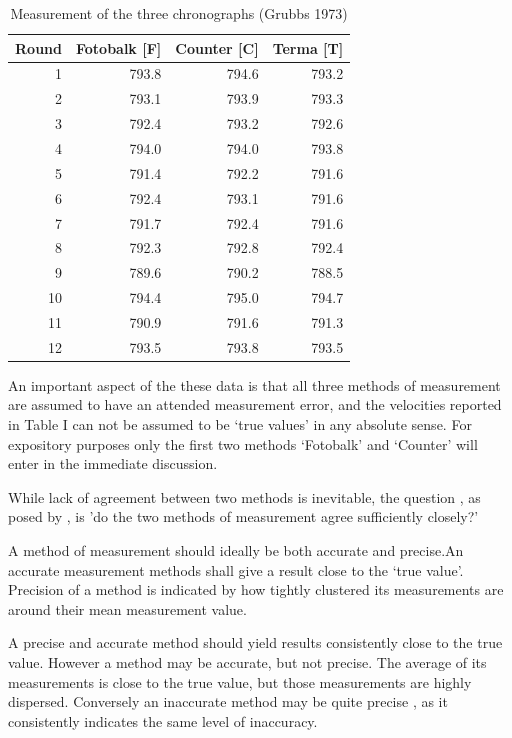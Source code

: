 \documentclass{report}
\begin{document}
\begin{table}[ht]
	\begin{center}
		\begin{tabular}{rrrr}
			\hline
			Round& Fotobalk [F] & Counter [C]& Terma [T]\\
			\hline
			1 & 793.8 & 794.6 & 793.2 \\
			2 & 793.1 & 793.9 & 793.3 \\
			3 & 792.4 & 793.2 & 792.6 \\
			4 & 794.0 & 794.0 & 793.8 \\
			5 & 791.4 & 792.2 & 791.6 \\
			6 & 792.4 & 793.1 & 791.6 \\
			7 & 791.7 & 792.4 & 791.6 \\
			8 & 792.3 & 792.8 & 792.4 \\
			9 & 789.6 & 790.2 & 788.5 \\
			10 & 794.4 & 795.0 & 794.7 \\
			11 & 790.9 & 791.6 & 791.3 \\
			12 & 793.5 & 793.8 & 793.5 \\
			\hline
		\end{tabular}
		\caption{Measurement of the three chronographs (Grubbs 1973)}
	\end{center}
\end{table}

An important aspect of the these data is that all three methods of
measurement are assumed to have an attended measurement error, and
the velocities reported in Table I can not be assumed to be `true
values' in any absolute sense. For expository purposes only the
first two methods `Fotobalk' and `Counter' will enter in the
immediate discussion.

While lack of agreement between two methods is inevitable, the question , as
 posed by \citet{BA83}, is 'do the two methods of measurement agree
sufficiently closely?'

A method of measurement should ideally be both accurate and
precise.An accurate measurement methods shall give a result close
to the `true value'. Precision of a method is indicated by how
tightly clustered its measurements are around their mean
measurement value.

\newpage

A precise and accurate method should yield results consistently
close to the true value. However a method may be accurate, but not
precise. The average of its measurements is close to the true
value, but those measurements are highly dispersed. Conversely an
inaccurate method may be quite precise , as it consistently
indicates the same level of inaccuracy.
\end{document}
